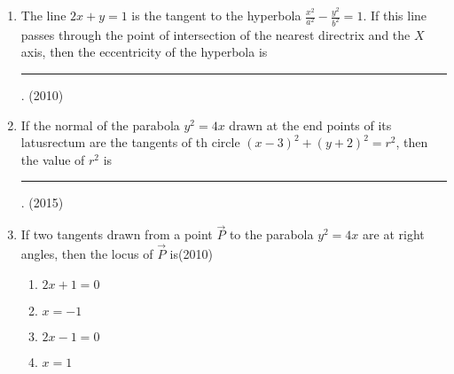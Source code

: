 	\begin{enumerate}
\item The line $2x+y=1$ is the tangent to the hyperbola $\frac{x^2}{a^2}-\frac{y^2}{b^2}=1$. If this line passes through the point of intersection of the nearest directrix and the $X$ axis, then the eccentricity of the hyperbola is
\rule{1cm}{0.1pt}.
\hfill(2010)
\iffalse
\item A Vertical line passing through point $(h,0)$ intersects the ellipse   at the points  $\Vec{P}$ and $\Vec{Q}$. Let the tangents to the ellipse at $\Vec{P}$ and $\Vec{Q}$ meet at the points $\Vec{R}$. If $\Delta(h)$= area of the triangle $PQR$, $\Delta_1$= ma
then 
\hfill(2013)
\begin{multicols}{2}
\begin{enumerate}
    \item $g(x)$ is continuous but not differentiable at a
    \item $g(x)$ is differentiable on R
    \item $g(x)$ is continuous but not differentiable at b
    \item $g(x)$ is continuous and differentiable either(a) or (b) but not both 
    \end{enumerate}
\end{multicols}
    \fi
\item If the normal of the parabola $y^2=4x$ drawn at the end points of its latusrectum are the tangents of th circle $(x-3)^2+(y+2)^2=r^2$, then the value of $r^2$ is \rule{1cm}{0.1pt}.
\hfill(2015)
\iffalse
\item Suppose that the focii of the ellipse $\frac{x^2}{9}+\frac{y^2}{5}=1$ are $(f_1,0)$ and ($f_2$,0) where $f_1>0$ and $f_1<0$.Let $P_1$ and $P_2$ be two parabolas with a common vertex at $(0,0)$ and with foci at ($f_1$,0) and (2$f_2$,0),respectively. Let $T_1$ be a tangent to $P_1$ which passes through (2$f_2$,0) and $T_2$ be a tangent to $P_2$ which passes through ($f_1$,0).If $m_1$ is the slope of $T_1$ and $m_2$ is the slope of $T_2$,then the value of
\hfill(2015)
\fi
\item If two tangents drawn from a point $\vec{P}$ to the parabola $y^2=4x$ are at right angles, then the locus of $\vec{P}$ is\hfill(2010)
\begin{multicols}{4}
\begin{enumerate}
    \item $2x+1=0$
    \item $x=-1$
    \item $2x-1=0$
    \item $x=1$

\end{enumerate}
\end{multicols}
\end{enumerate}
